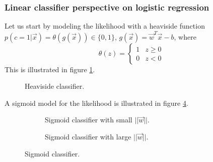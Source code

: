 \subsubsection{Linear classifier perspective on logistic regression}
Let us start by modeling the likelihood with a heaviside function
$p(c = 1|\vec{x}) = \theta(g(\vec{x})) \in \{0,1\}$, $g(\vec{x}) = \vec{w}^T \vec{x} - b$, where
\begin{equation}
    \theta(z) = \begin{cases}
        1 & z \geq 0 \\
        0 & z < 0
    \end{cases}
\end{equation}
This is illustrated in figure \ref{fig:heaviside_classifier}.
\begin{figure}[!htb]
    \centering
    
    \caption{Heaviside classifier.}
    \label{fig:heaviside_classifier}
\end{figure}

A sigmoid model for the likelihood is illustrated in figure \ref{fig:sigmoid_classifier}.

\begin{figure}

    \centering
    \begin{subfigure}{0.55\textwidth}
      \centering
      
      \caption{Sigmoid classifier with small $||\vec{w}||$.}
      \label{fig:sigmoid_classifier_small}
    \end{subfigure}%

    \begin{subfigure}{0.55\textwidth}
        \centering
        
        \caption{Sigmoid classifier with large $||\vec{w}||$.}
        \label{fig:sigmoid_classifier_large}
      \end{subfigure}

    \caption{Sigmoid classifier.}
    \label{fig:sigmoid_classifier}

\end{figure}

